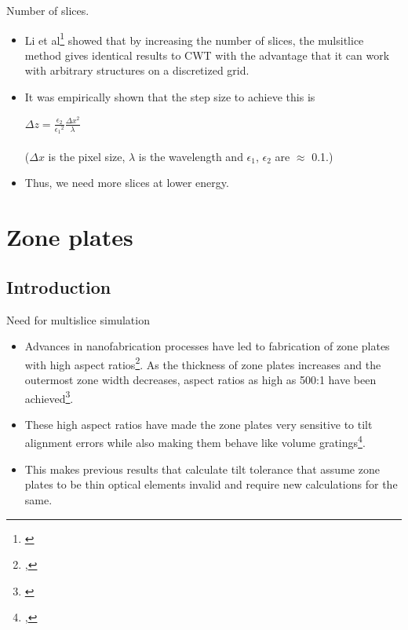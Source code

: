 \documentclass{beamer}
\begin{document}
\begin{frame}{Number of slices.}
\begin{itemize}
	\item Li et al\footnote{\cite{Li2017}} showed that by increasing the number of slices, the mulsitlice method gives identical results to CWT with the advantage that it can work with arbitrary structures on a discretized grid.
	\item It was empirically shown that the step size to achieve this is \\
	  \begin{center}
    $\Delta z = \frac{\epsilon_2}{{\epsilon_1}^2}\frac{{\Delta x}^2}{\lambda}$\\~\\
	 ($\Delta x$ is the pixel size, $\lambda$ is the wavelength and $\epsilon_1$, $\epsilon_2$ are $\approx$ 0.1.)
    	\end{center}
    \item Thus, we need more slices at lower energy. 

\end{itemize}
\end{frame}

\section{Zone plates}

\subsection{Introduction}
\begin{frame}{Need for multislice simulation}
\begin{itemize}
	\item Advances in nanofabrication processes have led to fabrication of zone plates with high aspect ratios\footnote{\cite{Chang2014},\cite{PhysRevLett.99.264801}}. As the thickness of zone plates increases and the outermost zone width decreases, aspect ratios as high as 500:1 have been achieved\footnote{\cite{Li2017b}}.
	\item These high aspect ratios have made the zone plates very sensitive to tilt alignment errors while also making them behave like volume gratings\footnote{\cite{Maser1992},\cite{Schneider1997}}.
	\item This makes previous results that calculate tilt tolerance that assume zone plates to be thin optical elements invalid and require new calculations for the same.
	
	
	
\end{itemize}
\end{frame}
\end{document}
